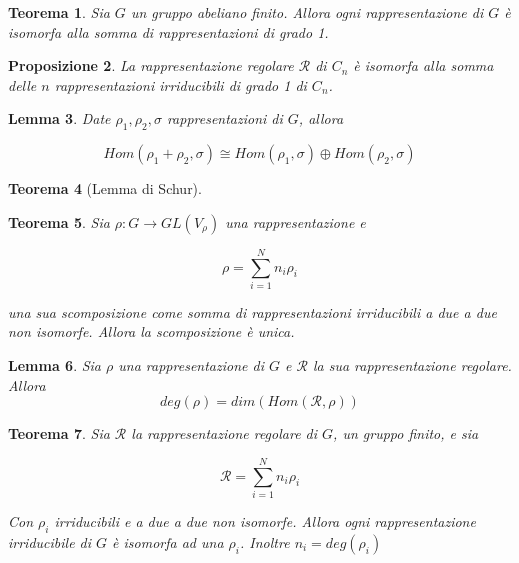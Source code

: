 \documentclass[11pt]{article}
\theoremstyle{plain}
\newtheorem{thm}{Teorema}[section]
\newtheorem{lemma}[thm]{Lemma}
\newtheorem{prop}[thm]{Proposizione}
\theoremstyle{definition}
\theoremstyle{remark}
\newcommand{\dsum}{\displaystyle\sum}
\begin{document}
\begin{thm}Sia $G$ un gruppo abeliano finito. Allora ogni rappresentazione di $G$ è isomorfa alla somma di rappresentazioni di grado 1.



\end{thm}


\begin{prop} La rappresentazione regolare $\mathcal{R}$ di $C_n$ è isomorfa alla somma delle $n$ rappresentazioni irriducibili di grado 1 di $C_n$.

\end{prop}


\begin{lemma}
Date $\rho_1, \rho_2, \sigma$ rappresentazioni di $G$, allora

\[Hom(\rho_1 + \rho_2, \sigma) \cong Hom(\rho_1, \sigma) \oplus Hom(\rho_2, \sigma)\]

\end{lemma}


\begin{thm}[Lemma di Schur]


\end{thm}



\begin{thm}
Sia $\rho: G \to GL(V_\rho)$ una rappresentazione e 

\[\rho = \dsum_{i=1}^N n_i \rho_i \]

una sua scomposizione come somma di rappresentazioni irriducibili a due a due non isomorfe. Allora la scomposizione è unica.
\end{thm}



\begin{lemma}
Sia $\rho$ una rappresentazione di $G$ e $\mathcal{R}$ la sua rappresentazione regolare. Allora 
\[deg(\rho) = dim(Hom(\mathcal{R}, \rho))\]
\end{lemma}




\begin{thm}
Sia $\mathcal{R}$ la rappresentazione regolare di $G$, un gruppo finito, e sia 

\[ \mathcal{R} = \dsum_{i=1}^Nn_i \rho_i\]

Con $\rho_i$ irriducibili e a due a due non isomorfe. Allora ogni rappresentazione irriducibile di $G$ è isomorfa ad una $\rho_i$. Inoltre $n_i = deg(\rho_i)$ 
\end{thm}
\end{document}
